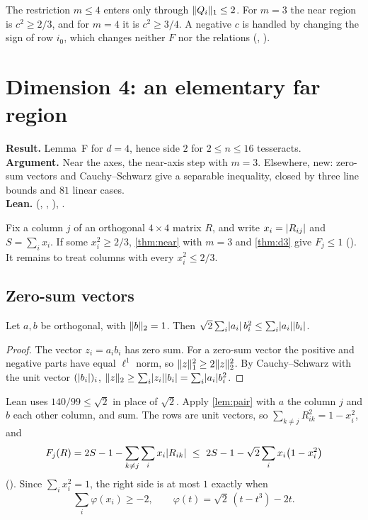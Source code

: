\documentclass[11pt,a4paper]{article}
\begin{document}
The restriction $m\le 4$ enters only through $\lVert Q_i\rVert_1\le2$. For $m=3$ the near region is $c^2\ge2/3$, and for $m=4$ it is $c^2\ge3/4$. A negative $c$ is handled by changing the sign of row $i_0$, which changes neither $F$ nor the relations (, ).

\section{Dimension 4: an elementary far region}\label{sec:d4}

\begin{summarybox}
\textbf{Result.} Lemma~F for $d=4$, hence side $2$ for $2\le n\le16$ tesseracts.\\
\textbf{Argument.} Near the axes, the near-axis step with $m=3$. Elsewhere, new: zero-sum vectors and Cauchy--Schwarz give a separable inequality, closed by three line bounds and $81$ linear cases.\\
\textbf{Lean.}  (, , ), .
\end{summarybox}

Fix a column $j$ of an orthogonal $4\times4$ matrix $R$, and write $x_i=\lvert R_{ij}\rvert$ and $S=\sum_ix_i$. If some $x_i^2\ge2/3$, \cref{thm:near} with $m=3$ and \cref{thm:d3} give $F_j\le1$ (). It remains to treat columns with every $x_i^2\le 2/3$.

\subsection{Zero-sum vectors}

\begin{lemma}\label{lem:pair}
Let $a,b$ be orthogonal, with $\lVert b\rVert_2=1$. Then $\sqrt2\sum_i\lvert a_i\rvert\,b_i^2\le\sum_i\lvert a_i\rvert\lvert b_i\rvert$.
\end{lemma}
\begin{proof}
The vector $z_i=a_ib_i$ has zero sum. For a zero-sum vector the positive and negative parts have equal $\ell^1$ norm, so $\lVert z\rVert_1^2\ge 2\lVert z\rVert_2^2$. By Cauchy--Schwarz with the unit vector $(\lvert b_i\rvert)_i$, $\lVert z\rVert_2\ge\sum_i\lvert z_i\rvert\lvert b_i\rvert=\sum_i\lvert a_i\rvert b_i^2$.
\end{proof}

Lean uses $140/99\le\sqrt2$ in place of $\sqrt2$. Apply \cref{lem:pair} with $a$ the column $j$ and $b$ each other column, and sum. The rows are unit vectors, so $\sum_{k\ne j}R_{ik}^2=1-x_i^2$, and
\begin{equation}\label{eq:far4}
F_j(R)=2S-1-\sum_{k\ne j}\sum_i x_i\lvert R_{ik}\rvert\ \le\ 2S-1-\sqrt2\sum_i x_i\bigl(1-x_i^2\bigr)
\end{equation}
(). Since $\sum_ix_i^2=1$, the right side is at most $1$ exactly when
\[
\sum_i\varphi(x_i)\ge-2,\qquad\varphi(t)=\sqrt2\,(t-t^3)-2t.
\]
\end{document}
